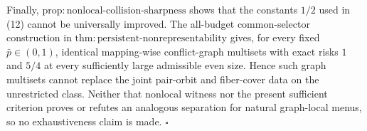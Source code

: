 Finally, \(\mathrm{prop{:}nonlocal\text{-}collision\text{-}sharpness}\) shows that the constants \(1/2\) used in (12) cannot be universally improved. The all-budget common-selector construction in \(\mathrm{thm{:}persistent\text{-}nonrepresentability}\) gives, for every fixed \(\bar p\in(0,1)\), identical mapping-wise conflict-graph multisets with exact risks \(1\) and \(5/4\) at every sufficiently large admissible even size. Hence such graph multisets cannot replace the joint pair-orbit and fiber-cover data on the unrestricted class. Neither that nonlocal witness nor the present sufficient criterion proves or refutes an analogous separation for natural graph-local menus, so no exhaustiveness claim is made. \(\square\)